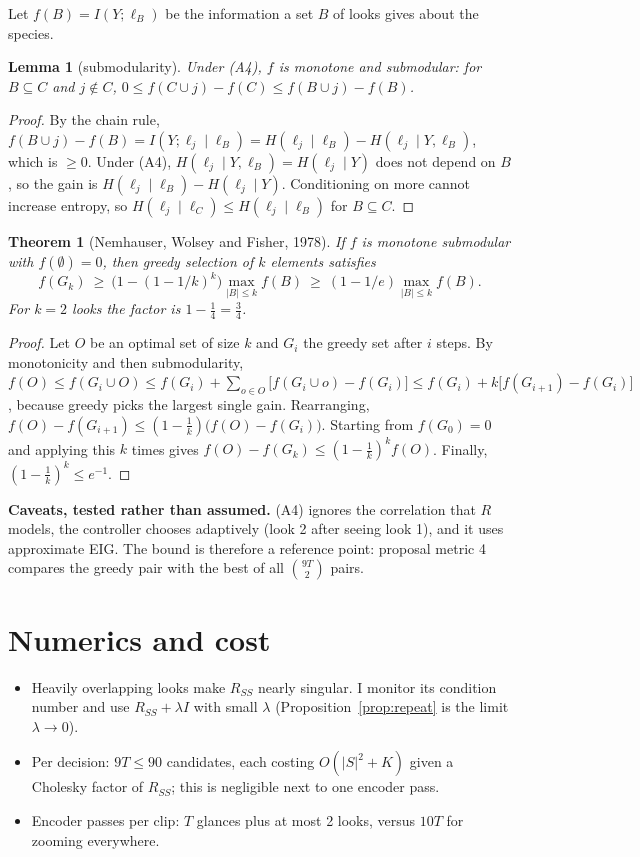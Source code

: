 \documentclass[11pt]{article}
\theoremstyle{plain}
\newtheorem{lem}[prop]{Lemma}
\newtheorem{thm}[prop]{Theorem}
\theoremstyle{remark}
\begin{document}
Let $f(B)=I(Y;\bm\ell_B)$ be the information a set $B$ of looks gives about the species.

\begin{lem}[submodularity]\label{lem:submod}
Under (A4), $f$ is monotone and submodular: for $B\subseteq C$ and $j\notin C$, $0\le f(C\cup j)-f(C)\le f(B\cup j)-f(B)$.
\end{lem}
\begin{proof}
By the chain rule, $f(B\cup j)-f(B)=I(Y;\ell_j\mid\bm\ell_B)=H(\ell_j\mid\bm\ell_B)-H(\ell_j\mid Y,\bm\ell_B)$, which is $\ge0$. Under (A4), $H(\ell_j\mid Y,\bm\ell_B)=H(\ell_j\mid Y)$ does not depend on $B$, so the gain is $H(\ell_j\mid\bm\ell_B)-H(\ell_j\mid Y)$. Conditioning on more cannot increase entropy, so $H(\ell_j\mid\bm\ell_C)\le H(\ell_j\mid\bm\ell_B)$ for $B\subseteq C$.
\end{proof}

\begin{thm}[Nemhauser, Wolsey and Fisher, 1978]\label{thm:greedy}
If $f$ is monotone submodular with $f(\emptyset)=0$, then greedy selection of $k$ elements satisfies
\[ f(G_k)\ \ge\ \big(1-(1-1/k)^k\big)\max_{|B|\le k}f(B)\ \ge\ (1-1/e)\max_{|B|\le k}f(B). \]
For $k=2$ looks the factor is $1-\frac14=\frac34$.
\end{thm}
\begin{proof}
Let $O$ be an optimal set of size $k$ and $G_i$ the greedy set after $i$ steps. By monotonicity and then submodularity,
$f(O)\le f(G_i\cup O)\le f(G_i)+\sum_{o\in O}\big[f(G_i\cup o)-f(G_i)\big]\le f(G_i)+k\big[f(G_{i+1})-f(G_i)\big]$,
because greedy picks the largest single gain. Rearranging, $f(O)-f(G_{i+1})\le(1-\frac1k)\big(f(O)-f(G_i)\big)$. Starting from $f(G_0)=0$ and applying this $k$ times gives $f(O)-f(G_k)\le(1-\frac1k)^kf(O)$. Finally, $(1-\frac1k)^k\le e^{-1}$.
\end{proof}

\textbf{Caveats, tested rather than assumed.} (A4) ignores the correlation that $R$ models, the controller chooses adaptively (look 2 after seeing look 1), and it uses approximate EIG. The bound is therefore a reference point: proposal metric 4 compares the greedy pair with the best of all $\binom{9T}{2}$ pairs.

\section{Numerics and cost}
\begin{itemize}
  \item Heavily overlapping looks make $R_{SS}$ nearly singular. I monitor its condition number and use $R_{SS}+\lambda I$ with small $\lambda$ (Proposition~\ref{prop:repeat} is the limit $\lambda\to0$).
  \item Per decision: $9T\le90$ candidates, each costing $O(|S|^2+K)$ given a Cholesky factor of $R_{SS}$; this is negligible next to one encoder pass.
  \item Encoder passes per clip: $T$ glances plus at most 2 looks, versus $10T$ for zooming everywhere.
\end{itemize}
\end{document}
